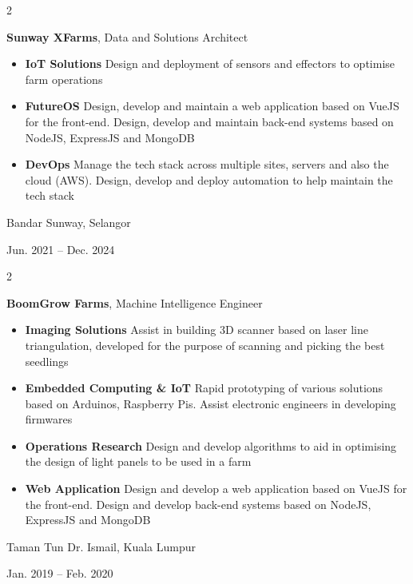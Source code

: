 \documentclass[10pt, letterpaper]{article}
\newenvironment{highlights}{
    \begin{itemize}[
        topsep=0.10 cm,
        parsep=0.10 cm,
        partopsep=0pt,
        itemsep=0pt,
        leftmargin=0.4 cm + 10pt
    ]
}{
    \end{itemize}
} %
\newenvironment{twocolentry}[2][]{
    \onecolentry
    \def\secondColumn{#2}
    \setcolumnwidth{\fill, 4.5 cm}
    \begin{paracol}{2}
}{
    \switchcolumn \raggedleft \secondColumn
    \end{paracol}
    \endonecolentry
} %
\begin{document}
        \begin{twocolentry}{
            Bandar Sunway, Selangor

        Jun. 2021 – Dec. 2024
        }
            \textbf{Sunway XFarms}, Data and Solutions Architect
            \begin{highlights}
                \item \textbf{IoT Solutions} Design and deployment of sensors and effectors to optimise farm operations
                \item \textbf{FutureOS} Design, develop and maintain a web application based on VueJS for the front-end. 
                    Design, develop and maintain back-end systems based on NodeJS, ExpressJS and MongoDB
                \item \textbf{DevOps} Manage the tech stack across multiple sites, servers and also the cloud (AWS). 
                    Design, develop and deploy automation to help maintain the tech stack
            \end{highlights}
        \end{twocolentry}

        
        \begin{twocolentry}{
            Taman Tun Dr. Ismail, Kuala Lumpur

        Jan. 2019 – Feb. 2020
        }
            \textbf{BoomGrow Farms}, Machine Intelligence Engineer
            \begin{highlights}
                \item \textbf{Imaging Solutions} Assist in building 3D scanner based on laser line triangulation, 
                    developed for the purpose of scanning and picking the best seedlings
                \item \textbf{Embedded Computing \& IoT} Rapid prototyping of various solutions based on Arduinos, Raspberry Pis.
                     Assist electronic engineers in developing firmwares
                \item \textbf{Operations Research} Design and develop algorithms to aid in optimising the design of light panels to be used in a farm
                \item \textbf{Web Application} Design and develop a web application based on VueJS for the front-end.
                     Design and develop back-end systems based on NodeJS, ExpressJS and MongoDB
            \end{highlights}
        \end{twocolentry}
\end{document}
